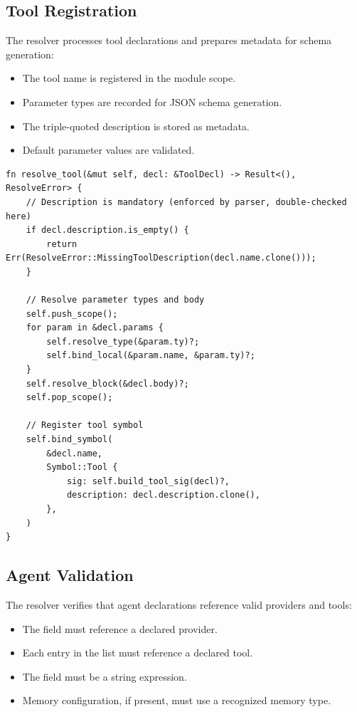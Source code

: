 \subsection{Tool Registration}

The resolver processes tool declarations and prepares metadata for schema generation:

\begin{itemize}
    \item The tool name is registered in the module scope.
    \item Parameter types are recorded for JSON schema generation.
    \item The triple-quoted description is stored as metadata.
    \item Default parameter values are validated.
\end{itemize}

\begin{lstlisting}[language={}]
fn resolve_tool(&mut self, decl: &ToolDecl) -> Result<(), ResolveError> {
    // Description is mandatory (enforced by parser, double-checked here)
    if decl.description.is_empty() {
        return Err(ResolveError::MissingToolDescription(decl.name.clone()));
    }

    // Resolve parameter types and body
    self.push_scope();
    for param in &decl.params {
        self.resolve_type(&param.ty)?;
        self.bind_local(&param.name, &param.ty)?;
    }
    self.resolve_block(&decl.body)?;
    self.pop_scope();

    // Register tool symbol
    self.bind_symbol(
        &decl.name,
        Symbol::Tool {
            sig: self.build_tool_sig(decl)?,
            description: decl.description.clone(),
        },
    )
}
\end{lstlisting}

\subsection{Agent Validation}

The resolver verifies that agent declarations reference valid providers and tools:

\begin{itemize}
    \item The  field must reference a declared provider.
    \item Each entry in the  list must reference a declared tool.
    \item The  field must be a string expression.
    \item Memory configuration, if present, must use a recognized memory type.
\end{itemize}

